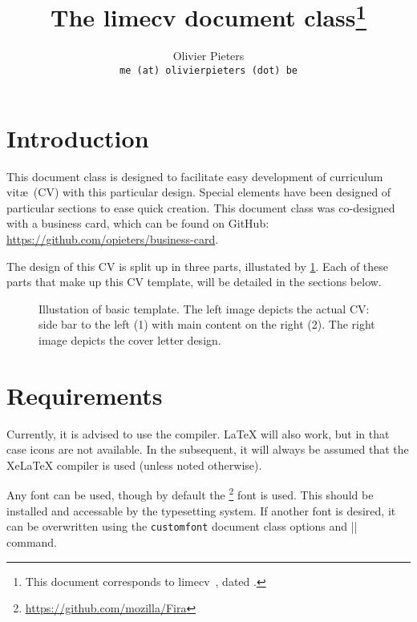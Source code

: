 \documentclass{ltxdoc}
\title{The \textsf{limecv} document class\thanks{This document corresponds to \textsf{limecv}~\fileversion, dated \filedate.}}
\author{Olivier Pieters \\ \texttt{me (at) olivierpieters (dot) be}}
\begin{document}
\maketitle

\tableofcontents

\section{Introduction}

This document class is designed to facilitate easy development of curriculum vit\ae\ (CV) with this particular design. Special elements have been designed of particular sections to ease quick creation. This document class was co-designed with a business card, which can be found on GitHub: \url{https://github.com/opieters/business-card}.

The design of this CV is split up in three parts, illustated by \cref{design}. Each of these parts that make up this CV template, will be detailed in the sections below.

\begin{figure}[!ht]
  \centering
  \hspace{2cm}%
  \caption{Illustation of basic template. The left image depicts the actual CV: side bar to the left (1) with main content on the right (2). The right image depicts the cover letter design.}
  \label{design}
\end{figure}

\section{Requirements}

  Currently, it is advised to use the  compiler. LaTeX will also work, but in that case icons are not available. In the subsequent, it will always be assumed that the XeLaTeX compiler is used (unless noted otherwise). 

  Any font can be used, though by default the \footnote{\url{https://github.com/mozilla/Fira}} font is used. This should be installed and accessable by the typesetting system. If another font is desired, it can be overwritten using the \lstinline|customfont| document class options and |\cvMainFont| command. 
\end{document}
